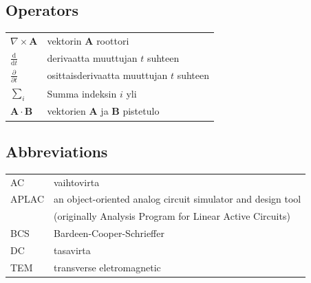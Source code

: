 \documentclass[english,12pt,a4paper,pdftex,elec,utf8]{aaltothesis}
\begin{document}
\subsection*{Operators}

\begin{tabular}{ll}
$\nabla \times \mathbf{A}$              & vektorin $\mathbf{A}$ roottori\\
$\displaystyle\frac{\mbox{d}}{\mbox{d} t}$ & derivaatta muuttujan $t$ suhteen\\
[3mm]
$\displaystyle\frac{\partial}{\partial t}$  & osittaisderivaatta muuttujan $t$ suhteen \\[3mm]
$\sum_i $                       & Summa indeksin $i$ yli\\
$\mathbf{A} \cdot \mathbf{B}$    & vektorien $\mathbf{A}$ ja $\mathbf{B}$ pistetulo
\end{tabular}

\subsection*{Abbreviations}

\begin{tabular}{ll}
AC         & vaihtovirta \\
APLAC      & an object-oriented analog circuit simulator and design tool \\
           & (originally Analysis Program for Linear Active Circuits) \\
BCS        & Bardeen-Cooper-Schrieffer \\ %
DC         & tasavirta \\
TEM        & transverse eletromagnetic
\end{tabular}


\cleardoublepage
\storeinipagenumber
{}
\setcounter{page}{1}
\end{document}
